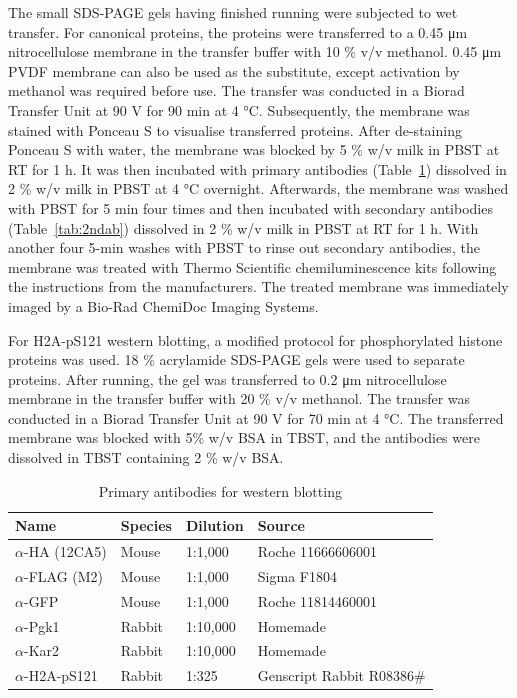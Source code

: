 The small SDS-PAGE gels having finished running were subjected to wet transfer. For canonical proteins, the proteins were transferred to a 0.45 \si{\micro\metre} nitrocellulose membrane in the transfer buffer with 10 \% v/v methanol. 0.45 \si{\micro\metre} PVDF membrane can also be used as the substitute, except activation by methanol was required before use. The transfer was conducted in a Biorad Transfer Unit at 90 \si{\volt} for 90 \si{\minute} at 4 \si{\celsius}. Subsequently, the membrane was stained with Ponceau S to visualise transferred proteins. After de-staining Ponceau S with water, the membrane was blocked by 5 \% w/v milk in PBST at RT for 1 \si{\hour}. It was then incubated with primary antibodies (Table~\ref{tab:1stab}) dissolved in 2 \% w/v milk in PBST at 4 \si{\celsius} overnight. Afterwards, the membrane was washed with PBST for 5 \si{\minute} four times and then incubated with secondary antibodies (Table~\ref{tab:2ndab}) dissolved in 2 \% w/v milk in PBST at RT for 1 \si{\hour}. With another four 5-min washes with PBST to rinse out secondary antibodies, the membrane was treated with Thermo Scientific chemiluminescence kits following the instructions from the manufacturers. The treated membrane was immediately imaged by a Bio-Rad ChemiDoc Imaging Systems. 

For H2A-pS121 western blotting, a modified protocol for phosphorylated histone proteins was used. 18 \% acrylamide SDS-PAGE gels were used to separate proteins. After running, the gel was transferred to 0.2 \si{\micro\metre} nitrocellulose membrane in the transfer buffer with 20 \% v/v methanol. The transfer was conducted in a Biorad Transfer Unit at 90 \si{\volt} for 70 \si{\minute} at 4 \si{\celsius}. The transferred membrane was blocked with 5\% w/v BSA in TBST, and the antibodies were dissolved in TBST containing 2 \% w/v BSA. 

\begin{table}[htbp]
\centering
\caption{Primary antibodies for western blotting}
\label{tab:1stab}
\begin{tabular}{llll}
\hline
\textbf{Name} & \textbf{Species} & \textbf{Dilution} & \textbf{Source} \\ \hline
$\alpha$-HA (12CA5) & Mouse & 1:1,000 & Roche 11666606001 \\   
$\alpha$-FLAG (M2) & Mouse & 1:1,000 & Sigma F1804 \\   
$\alpha$-GFP & Mouse & 1:1,000 & Roche 11814460001 \\
$\alpha$-Pgk1 & Rabbit & 1:10,000 & Homemade \\
$\alpha$-Kar2 & Rabbit & 1:10,000 & Homemade \\
$\alpha$-H2A-pS121 & Rabbit & 1:325 & Genscript Rabbit R08386\# \\
\end{tabular}
\end{table}

